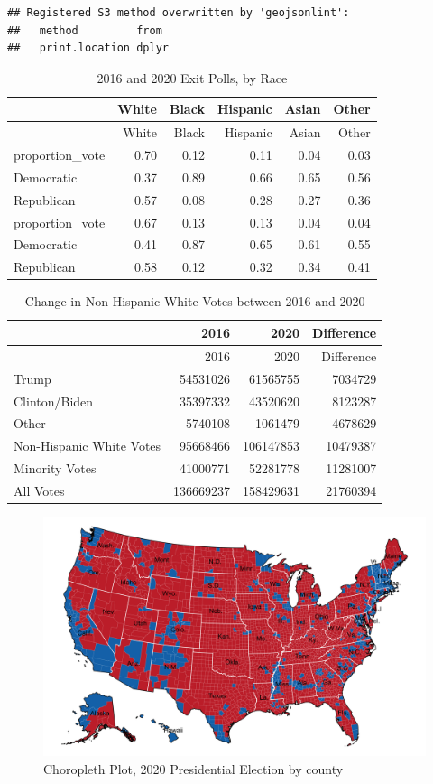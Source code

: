 \documentclass[
]{article}
\begin{document}
\begin{verbatim}
## Registered S3 method overwritten by 'geojsonlint':
##   method         from 
##   print.location dplyr
\end{verbatim}

\begin{longtable}[]{@{}lrrrrr@{}}
\caption{2016 and 2020 Exit Polls, by Race}\tabularnewline
\toprule()
& White & Black & Hispanic & Asian & Other \\
\midrule()
\endfirsthead
\toprule()
& White & Black & Hispanic & Asian & Other \\
\midrule()
\endhead
proportion\_vote & 0.70 & 0.12 & 0.11 & 0.04 & 0.03 \\
Democratic & 0.37 & 0.89 & 0.66 & 0.65 & 0.56 \\
Republican & 0.57 & 0.08 & 0.28 & 0.27 & 0.36 \\
proportion\_vote & 0.67 & 0.13 & 0.13 & 0.04 & 0.04 \\
Democratic & 0.41 & 0.87 & 0.65 & 0.61 & 0.55 \\
Republican & 0.58 & 0.12 & 0.32 & 0.34 & 0.41 \\
\bottomrule()
\end{longtable}

\begin{longtable}[]{@{}lrrr@{}}
\caption{Change in Non-Hispanic White Votes between 2016 and
2020}\tabularnewline
\toprule()
& 2016 & 2020 & Difference \\
\midrule()
\endfirsthead
\toprule()
& 2016 & 2020 & Difference \\
\midrule()
\endhead
Trump & 54531026 & 61565755 & 7034729 \\
Clinton/Biden & 35397332 & 43520620 & 8123287 \\
Other & 5740108 & 1061479 & -4678629 \\
Non-Hispanic White Votes & 95668466 & 106147853 & 10479387 \\
Minority Votes & 41000771 & 52281778 & 11281007 \\
All Votes & 136669237 & 158429631 & 21760394 \\
\bottomrule()
\end{longtable}

\begin{figure}
\centering
\includegraphics{images/fig-4-1.png}
\caption{Choropleth Plot, 2020 Presidential Election by county}
\end{figure}
\end{document}
